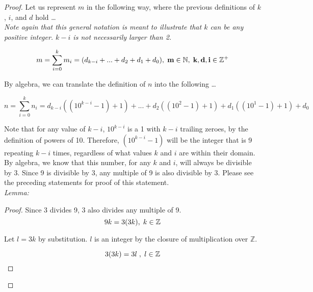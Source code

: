 \documentclass[12pt]{article}
\begin{document}
\begin{proof}
\bigskip
Let us represent $m$ in the following way, where the previous definitions of $k$, $i$, and $d$ hold \ldots\\

\noindent\textit{Note again that this general notation is meant to illustrate that $k$ can be any positive integer. $k - i$ is not necessarily larger than 2.}

\begin{equation}
m = \sum_{i = 0}^{k} m_{i} = (d_{k - i} + ... + d_{2} + d_{1} + d_{0}) , \hspace{.1cm} \textbf{m} \in \mathbb{N}, \hspace{.1cm} \textbf{k},\textbf{d},\textbf{i} \in \mathbb{Z^+}
\end{equation}
\bigskip

By algebra, we can translate the definition of $n$ into the following \ldots

\begin{equation}
n = \sum_{i = 0}^{k} n_{i} = d_{k - i}((10^{k - i} - 1) + 1) + ... + d_{2}((10^{2} - 1) + 1) + d_{1}((10^{1} - 1) + 1) + d_{0}
\end{equation}
\bigskip

Note that for any value of $k - i$, $10^{k - i}$ is a 1 with $k - i$ trailing zeroes, by the definition of powers of 10. Therefore, $(10^{k - i} - 1)$ will be the integer that is 9 repeating $k - i$ times, regardless of what values $k$ and $i$ are within their domain. \\

By algebra, we know that this number, for any $k$ and $i$, will always be divisible by 3. Since 9 is divisible by 3, any multiple of 9 is also divisible by 3. Please see the preceding statements for proof of this statement.\\

\textit{Lemma:}\\

\begin{proof}
Since 3 divides 9, 3 also divides any multiple of 9. \\

\begin{equation}
9k = 3(3k) , \hspace{.1cm} k \in \mathbb{Z}
\end{equation}
\bigskip

Let $l = 3k$ by substitution. $l$ is an integer by the closure of multiplication over $\mathbb{Z}$.

\begin{equation}
3(3k) = 3l \hspace{.1cm}, \hspace{.1cm} l \in \mathbb{Z}
\end{equation}
\bigskip


\end{proof}
\end{proof}
\end{document}
